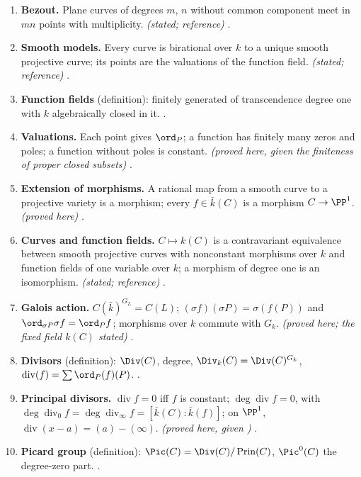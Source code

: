 \begin{enumerate}[label=\textbf{\thechapter.\arabic*}]
\item \textbf{Bezout.} Plane curves of degrees $m$, $n$ without common component meet in $mn$ points with multiplicity. \emph{(stated; reference)} .
\item \textbf{Smooth models.} Every curve is birational over $k$ to a unique smooth projective curve; its points are the valuations of the function field. \emph{(stated; reference)}
.
\item \textbf{Function fields} (definition): finitely generated of transcendence degree one with $k$ algebraically closed in it. .
\item \textbf{Valuations.} Each point gives $\ord_P$; a function has finitely many zeros and poles; a function without poles is constant. \emph{(proved here, given the finiteness of
proper closed subsets)} .
\item \textbf{Extension of morphisms.} A rational map from a smooth curve to a projective variety is a morphism; every $f\in\bar k(C)$ is a morphism $C\to\PP^1$. \emph{(proved here)}
.
\item \textbf{Curves and function fields.} $C\mapsto k(C)$ is a contravariant equivalence between smooth projective curves with nonconstant morphisms over $k$ and function fields of one
variable over $k$; a morphism of degree one is an isomorphism. \emph{(stated; reference)} .
\item \textbf{Galois action.} $C(\bar k)^{G_L}=C(L)$; $(\sigma f)(\sigma P)=\sigma(f(P))$ and $\ord_{\sigma P}\sigma f=\ord_Pf$; morphisms over $k$ commute with $G_k$. \emph{(proved here; the fixed
field $k(C)$ stated)} .
\item \textbf{Divisors} (definition): $\Div(C)$, degree, $\Div_k(C)=\Div(C)^{G_k}$, $\operatorname{div}(f)=\sum\ord_P(f)(P)$. .
\item \textbf{Principal divisors.} $\operatorname{div}f=0$ iff $f$ is constant; $\deg\operatorname{div}f=0$, with $\deg\operatorname{div}_0f=\deg\operatorname{div}_\infty f=[\bar k(C):\bar k(f)]$; on $\PP^1$,
$\operatorname{div}(x-a)=(a)-(\infty)$. \emph{(proved here, given )} .
\item \textbf{Picard group} (definition): $\Pic(C)=\Div(C)/\operatorname{Prin}(C)$, $\Pic^0(C)$ the degree-zero part. .

\end{enumerate}

